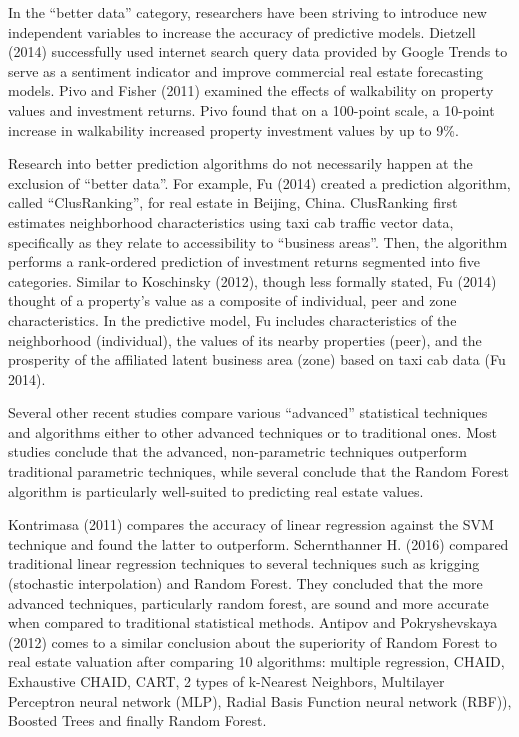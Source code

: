 \documentclass[12pt,]{article}
\begin{document}
In the ``better data'' category, researchers have been striving to
introduce new independent variables to increase the accuracy of
predictive models. Dietzell (2014) successfully used internet search
query data provided by Google Trends to serve as a sentiment indicator
and improve commercial real estate forecasting models. Pivo and Fisher
(2011) examined the effects of walkability on property values and
investment returns. Pivo found that on a 100-point scale, a 10-point
increase in walkability increased property investment values by up to
9\%.

Research into better prediction algorithms do not necessarily happen at
the exclusion of ``better data''. For example, Fu (2014) created a
prediction algorithm, called ``ClusRanking'', for real estate in
Beijing, China. ClusRanking first estimates neighborhood characteristics
using taxi cab traffic vector data, specifically as they relate to
accessibility to ``business areas''. Then, the algorithm performs a
rank-ordered prediction of investment returns segmented into five
categories. Similar to Koschinsky (2012), though less formally stated,
Fu (2014) thought of a property's value as a composite of individual,
peer and zone characteristics. In the predictive model, Fu includes
characteristics of the neighborhood (individual), the values of its
nearby properties (peer), and the prosperity of the affiliated latent
business area (zone) based on taxi cab data (Fu 2014).

Several other recent studies compare various ``advanced'' statistical
techniques and algorithms either to other advanced techniques or to
traditional ones. Most studies conclude that the advanced,
non-parametric techniques outperform traditional parametric techniques,
while several conclude that the Random Forest algorithm is particularly
well-suited to predicting real estate values.

Kontrimasa (2011) compares the accuracy of linear regression against the
SVM technique and found the latter to outperform. Schernthanner H.
(2016) compared traditional linear regression techniques to several
techniques such as krigging (stochastic interpolation) and Random
Forest. They concluded that the more advanced techniques, particularly
random forest, are sound and more accurate when compared to traditional
statistical methods. Antipov and Pokryshevskaya (2012) comes to a
similar conclusion about the superiority of Random Forest to real estate
valuation after comparing 10 algorithms: multiple regression, CHAID,
Exhaustive CHAID, CART, 2 types of k-Nearest Neighbors, Multilayer
Perceptron neural network (MLP), Radial Basis Function neural network
(RBF)), Boosted Trees and finally Random Forest.
\end{document}
